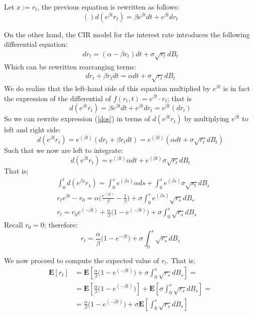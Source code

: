 \documentclass[12pt]{article}
\begin{document}
Let $x := r_t$, the previous equation is rewritten as follows:
\begin{equation} (\label{dif})
d( e^{\beta t} r_t) =  \beta e^{\beta t}dt + e^{\beta t} dr_t
\end{equation}

On the other hand, the CIR model for the interest rate introduces the following differential equation:
\begin{align}
dr_t = (\alpha - \beta r_t)dt + \sigma \sqrt{r_t}dB_t
\end{align} 
Which can be rewritten rearranging terms:
\begin{align}\label{dos}
dr_t +\beta r_t dt = \alpha dt + \sigma \sqrt{r_t}dB_t
\end{align} 
We do realize that the left-hand side of this equation multiplied by $e^{\beta t}$ is in fact the expression of the differential of $f(r_t,t)=e^{\beta t}\cdot r_t$; that is
\begin{equation}
d( e^{\beta t} r_t) =  \beta e^{\beta t}dt + e^{\beta t} dr_t = e^{\beta t} \left(dr_t\right)
\end{equation}
So we can rewrite expression (\ref{dos}) in terms of $d( e^{\beta t} r_t)$ by multiplying  $e^{\beta t}$ to left and right side:
\begin{equation}
d( e^{\beta t} r_t)  = e^(\beta t ) \left(dr_t+\beta r_t dt\right) =  e^(\beta t ) (\alpha dt + \sigma \sqrt{r_t}dB_t)
\end{equation}
Such that we now are left to integrate:
\begin{equation}
d( e^{\beta t} r_t)  =  e^(\beta t ) \alpha dt +  e^(\beta t ) \sigma \sqrt{r_t}dB_t
\end{equation}
That is;
\begin{align}
& \int_0^t d( e^{\beta s} r_s) = \int_0^s e^(\beta s ) \alpha ds +  \int_0^s e^(\beta s ) \sigma \sqrt{s_t}dB_s \\
& r_t e^{\beta t} -r_0 = \alpha \bigg(\frac{e^(\beta t)}{\beta}-\frac{1}{\beta}\bigg) + \sigma \int_0^s e^(\beta s)\sqrt{r_s}dB_s \\
& r_t = r_0 e^(-\beta t) + \frac{\alpha}{\beta} \bigg(1-e^(-\beta t)\bigg) + \sigma \int_0^s \sqrt{r_s}dB_s 
\end{align}
Recall $r_0=0$; therefore:
\begin{equation}
\boxed{r_t = \frac{\alpha}{\beta} \bigg(1-e^{-\beta t}\bigg) + \sigma \int_0^s \sqrt{r_s}dB_s }
\end{equation}

We now proceed to compute the expected value of $r_t$. That is;
\begin{align}
\mathbf{E}[r_t] &= \mathbf{E} [\frac{\alpha}{\beta} \bigg(1-e^(-\beta t)\bigg) + \sigma \int_0^s \sqrt{r_s}dB_s ] = \\
&= \mathbf{E} [\frac{\alpha}{\beta} \bigg(1-e^(-\beta t)\bigg)] +\mathbf{E}[ \sigma \int_0^s \sqrt{r_s}dB_s ] = \\
&= \frac{\alpha}{\beta} \bigg(1-e^(-\beta t)\bigg) +\sigma \mathbf{E}[ \int_0^s \sqrt{r_s}dB_s ] 
\end{align}
\end{document}

